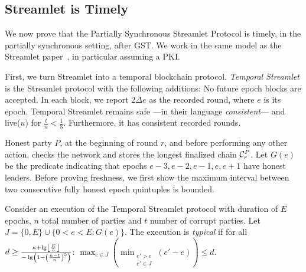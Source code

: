 \subsection{Streamlet is Timely}

We now prove that the Partially Synchronous Streamlet Protocol is timely,
in the partially synchronous setting, after GST.
We work in the same model as the Streamlet paper~\cite{streamlet},
in particular assuming a PKI.

First, we turn Streamlet into a temporal blockchain protocol.
\emph{Temporal Streamlet} is the Streamlet protocol with the
following additions: No future epoch blocks are accepted. In each block, we report
$2\Delta e$ as the recorded round, where $e$ is its epoch.
Temporal Streamlet remains safe ---in their language \emph{consistent}--- and live($u$)
for $\frac{t}{n} < \frac{1}{3}$. Furthermore, it has consistent recorded rounds.

Honest party $P$, at the beginning of round $r$, and
before performing any other action, checks the network and
stores the longest finalized chain $\chain^P_r$.
Let $G(e)$ be the predicate indicating that epochs $e-3,e-2,e-1,e,e+1$ have honest leaders.
Before proving freshness, we first show the maximum interval between two consecutive fully
honest epoch quintuples is bounded.

\begin{definition}
  Consider an execution of the Temporal Streamlet protocol with duration
  of $E$ epochs, $n$ total number of parties and $t$ number of corrupt parties.
  Let $J = \{0,E\} \cup \{0 < e < E: G(e)\}$.
  The execution is \emph{typical} if for all
  $d \geq \frac{\kappa + \lg \floor*{\frac{E}{5}}}{- \lg \left(1 - \left(\frac{n - t}{n}\right)^5\right)}$:
  $\max_{e \in J}(\min_{\substack{e' > e \\ e' \in J}}(e' - e)) \leq d$.
\end{definition}


